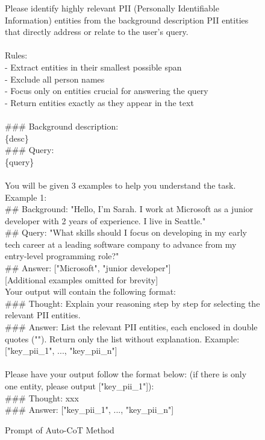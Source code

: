 \begin{figure*}[htbp]
\begin{tcolorbox}[colback=white, colframe=black, title=Auto Chain-of-Thought Query-related PII Detection Prompt with Examples]
Please identify highly relevant PII (Personally Identifiable Information) entities from the background description PII entities that directly address or relate to the user's query.\\
\\
Rules:\\
- Extract entities in their smallest possible span\\
- Exclude all person names\\
- Focus only on entities crucial for answering the query\\
- Return entities exactly as they appear in the text\\
\\
\#\#\# Background description:\\
\{desc\}\\
\#\#\# Query:\\
\{query\}\\
\\
You will be given 3 examples to help you understand the task.\\
Example 1:\\
\#\# Background: "Hello, I'm Sarah. I work at Microsoft as a junior developer with 2 years of experience. I live in Seattle."\\
\#\# Query: "What skills should I focus on developing in my early tech career at a leading software company to advance from my entry-level programming role?"\\
\#\# Answer: ["Microsoft", "junior developer"]\\

[Additional examples omitted for brevity]\\

Your output will contain the following format:\\
\#\#\# Thought: Explain your reasoning step by step for selecting the relevant PII entities.\\
\#\#\# Answer: List the relevant PII entities, each enclosed in double quotes (""). Return only the list without explanation. Example: ["key\_pii\_1", ..., "key\_pii\_n"]\\
\\
Please have your output follow the format below: (if there is only one entity, please output ["key\_pii\_1"]):\\
\#\#\# Thought: xxx\\
\#\#\# Answer: ["key\_pii\_1", ..., "key\_pii\_n"]\\
\end{tcolorbox}
\caption{Prompt of Auto-CoT Method}
\label{fig:auto-cot-prompt}
\end{figure*}

